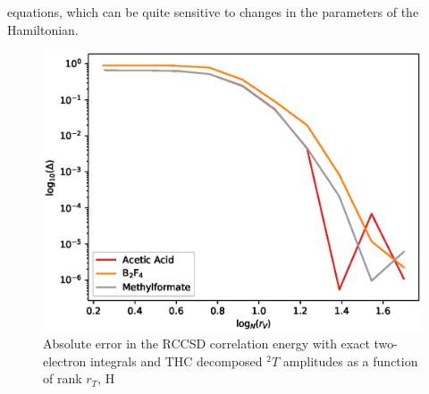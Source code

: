 equations, which can be quite sensitive to changes in the parameters of the 
Hamiltonian.
%
\begin{figure}[tb]
\includegraphics[width=\columnwidth]{figures/thc_rccsd/cc_err_ao_full_amps_only}
\caption{Absolute error in the RCCSD correlation energy with exact two-electron 
integrals and THC decomposed ${}^2T$ amplitudes as a function of rank $r_{T}$, H
\label{fig:cc_err_ao_full_amps_only}}
\end{figure}
%
